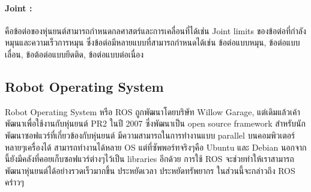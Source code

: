\paragraph*{Joint :}
คือข้อต่อของหุ่นยนต์สามารถกำหนดกลศาสตร์และการเคลื่อนที่ได้เช่น Joint limits ของข้อต่อที่กำลังหมุนและความเร็วการหมุน
ซึ่งข้อต่อมีหลายแบบที่สามารถกำหนดได้เช่น ข้อต่อแบบหมุน, ข้อต่อแบบเลื่อน, ข้อต้อต่อแบบยึดติด, ข้อต่อแบบต่อเนื่อง

\clearpage
\subsection{Robot Operating System}
Robot Operating System หรือ ROS ถูกพัฒนาโดยบริษัท Willow Garage, แต่เดิมแล้วเค้าพัฒนาเพื่อใช้งานกับหุ่นยนต์ PR2 ในปี 2007
ซึ่งพัฒนาเป็น open source framework สำหรับนักพัฒนาซอฟแวร์ที่เกี่ยวข้องกับหุ่นยนต์ มีความสามารถในการทำงานแบบ parallel
บนคอมพิวเตอร์หลายๆเครื่องได้ สามารถทำงานได้หลาย OS แต่ที่ซัพพอร์ทจริงๆคือ Ubuntu และ Debian นอกจากนี้ยังมีคลังที่คอยเก็บซอฟแวร์ต่างๆไว้เป็น
libraries อีกด้วย การใช้ ROS จะช่วยทำให้เราสามารถพัฒนาหุ่นยนต์ได้อย่างรวดเร็วมากขึ้น ประหยัดเวลา ประหยัดทรัพยากร
ในส่วนนี้จะกล่าวถึง ROS คร่าวๆ

